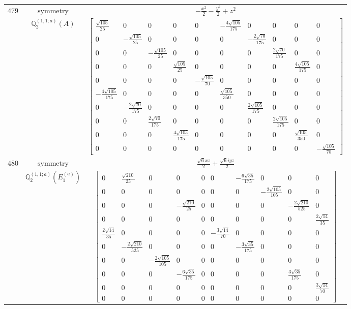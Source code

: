 \documentclass[fleqn,8pt,landscape]{jsarticle}
\begin{document}
\begin{longtable}{ccc}
$ 479 $ & $ \text{symmetry} $ & $ - \frac{x^{2}}{2} - \frac{y^{2}}{2} + z^{2} $ \\
$  $ & $ \mathbb{Q}_{2}^{(1,1;a)}(A) $ & $ \begin{bmatrix} \frac{\sqrt{105}}{25} & 0 & 0 & 0 & 0 & - \frac{4 \sqrt{105}}{175} & 0 & 0 & 0 & 0 \\ 0 & - \frac{\sqrt{105}}{25} & 0 & 0 & 0 & 0 & - \frac{2 \sqrt{70}}{175} & 0 & 0 & 0 \\ 0 & 0 & - \frac{\sqrt{105}}{25} & 0 & 0 & 0 & 0 & \frac{2 \sqrt{70}}{175} & 0 & 0 \\ 0 & 0 & 0 & \frac{\sqrt{105}}{25} & 0 & 0 & 0 & 0 & \frac{4 \sqrt{105}}{175} & 0 \\ 0 & 0 & 0 & 0 & - \frac{\sqrt{105}}{70} & 0 & 0 & 0 & 0 & 0 \\ - \frac{4 \sqrt{105}}{175} & 0 & 0 & 0 & 0 & \frac{\sqrt{105}}{350} & 0 & 0 & 0 & 0 \\ 0 & - \frac{2 \sqrt{70}}{175} & 0 & 0 & 0 & 0 & \frac{2 \sqrt{105}}{175} & 0 & 0 & 0 \\ 0 & 0 & \frac{2 \sqrt{70}}{175} & 0 & 0 & 0 & 0 & \frac{2 \sqrt{105}}{175} & 0 & 0 \\ 0 & 0 & 0 & \frac{4 \sqrt{105}}{175} & 0 & 0 & 0 & 0 & \frac{\sqrt{105}}{350} & 0 \\ 0 & 0 & 0 & 0 & 0 & 0 & 0 & 0 & 0 & - \frac{\sqrt{105}}{70} \end{bmatrix} $ \\ \hline
$ 480 $ & $ \text{symmetry} $ & $ \frac{\sqrt{6} x z}{2} + \frac{\sqrt{6} i y z}{2} $ \\
$  $ & $ \mathbb{Q}_{2}^{(1,1;a)}(E_{1}^{(a)}) $ & $ \begin{bmatrix} 0 & \frac{\sqrt{210}}{25} & 0 & 0 & 0 & 0 & - \frac{6 \sqrt{35}}{175} & 0 & 0 & 0 \\ 0 & 0 & 0 & 0 & 0 & 0 & 0 & - \frac{2 \sqrt{105}}{105} & 0 & 0 \\ 0 & 0 & 0 & - \frac{\sqrt{210}}{25} & 0 & 0 & 0 & 0 & - \frac{2 \sqrt{210}}{525} & 0 \\ 0 & 0 & 0 & 0 & 0 & 0 & 0 & 0 & 0 & \frac{2 \sqrt{14}}{35} \\ \frac{2 \sqrt{14}}{35} & 0 & 0 & 0 & 0 & - \frac{3 \sqrt{14}}{70} & 0 & 0 & 0 & 0 \\ 0 & - \frac{2 \sqrt{210}}{525} & 0 & 0 & 0 & 0 & - \frac{3 \sqrt{35}}{175} & 0 & 0 & 0 \\ 0 & 0 & - \frac{2 \sqrt{105}}{105} & 0 & 0 & 0 & 0 & 0 & 0 & 0 \\ 0 & 0 & 0 & - \frac{6 \sqrt{35}}{175} & 0 & 0 & 0 & 0 & \frac{3 \sqrt{35}}{175} & 0 \\ 0 & 0 & 0 & 0 & 0 & 0 & 0 & 0 & 0 & \frac{3 \sqrt{14}}{70} \\ 0 & 0 & 0 & 0 & 0 & 0 & 0 & 0 & 0 & 0 \end{bmatrix} $ \\ \hline

\end{longtable}
\end{document}
